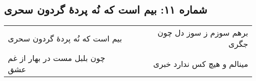 \begin{center}
\section*{شماره ۱۱: بیم است که نُه پردۀ گردون سحری}
\label{sec:011}
\begin{longtable}{l p{0.5cm} r}
بیم است که نُه پردهٔ گردون سحری
&&
برهم سوزم ز سوز دل چون جگری
\\
چون بلبل مست در بهار از غم عشق
&&
مینالم و هیچ کس ندارد خبری
\\
\end{longtable}
\end{center}
